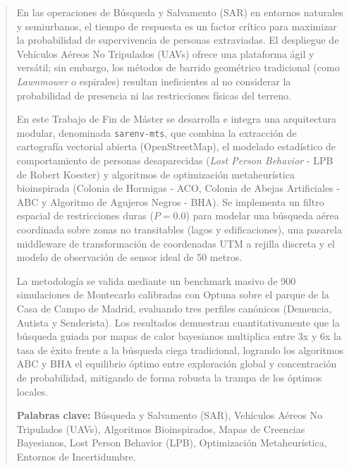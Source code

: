 \documentclass[12pt]{report} %
\begin{document}
\newpage %
\thispagestyle{empty}
\mbox{}

\renewcommand\abstractname{\large\bfseries\filcenter\uppercase{Resumen}}
\begin{abstract}
\thispagestyle{plain}
\setcounter{page}{3}
	
En las operaciones de Búsqueda y Salvamento (SAR) en entornos naturales y semiurbanos, el tiempo de respuesta es un factor crítico para maximizar la probabilidad de supervivencia de personas extraviadas. El despliegue de Vehículos Aéreos No Tripulados (UAVs) ofrece una plataforma ágil y versátil; sin embargo, los métodos de barrido geométrico tradicional (como \textit{Lawnmower} o espirales) resultan ineficientes al no considerar la probabilidad de presencia ni las restricciones físicas del terreno. 

En este Trabajo de Fin de Máster se desarrolla e integra una arquitectura modular, denominada \texttt{sarenv-mts}, que combina la extracción de cartografía vectorial abierta (OpenStreetMap), el modelado estadístico de comportamiento de personas desaparecidas (\textit{Lost Person Behavior} - LPB de Robert Koester) y algoritmos de optimización metaheurística bioinspirada (Colonia de Hormigas - ACO, Colonia de Abejas Artificiales - ABC y Algoritmo de Agujeros Negros - BHA). Se implementa un filtro espacial de restricciones duras ($P=0.0$) para modelar una búsqueda aérea coordinada sobre zonas no transitables (lagos y edificaciones), una pasarela middleware de transformación de coordenadas UTM a rejilla discreta y el modelo de observación de sensor ideal de 50 metros. 

La metodología se valida mediante un benchmark masivo de 900 simulaciones de Montecarlo calibradas con Optuna sobre el parque de la Casa de Campo de Madrid, evaluando tres perfiles canónicos (Demencia, Autista y Senderista). Los resultados demuestran cuantitativamente que la búsqueda guiada por mapas de calor bayesianos multiplica entre 3x y 6x la tasa de éxito frente a la búsqueda ciega tradicional, logrando los algoritmos ABC y BHA el equilibrio óptimo entre exploración global y concentración de probabilidad, mitigando de forma robusta la trampa de los óptimos locales.
	
\vspace{0.5cm}
\noindent\textbf{Palabras clave:} Búsqueda y Salvamento (SAR), Vehículos Aéreos No Tripulados (UAVs), Algoritmos Bioinspirados, Mapas de Creencias Bayesianos, Lost Person Behavior (LPB), Optimización Metaheurística, Entornos de Incertidumbre.
	
\vfill
\end{abstract}
\end{document}
